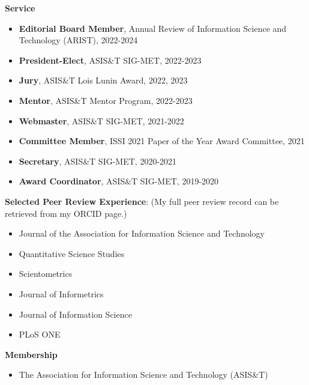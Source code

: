 \documentclass[margin, 10pt]{res} %
\begin{document}
\begin{resume}
\textbf{Service}
\begin{itemize}
\item \textbf{Editorial Board Member}, Annual Review of Information Science and Technology (ARIST), 2022-2024
\item \textbf{President-Elect}, ASIS\&T SIG-MET, 2022-2023
\item \textbf{Jury}, ASIS\&T Lois Lunin Award, 2022, 2023
\item \textbf{Mentor}, ASIS\&T Mentor Program, 2022-2023
\item \textbf{Webmaster}, ASIS\&T SIG-MET, 2021-2022
\item \textbf{Committee Member}, ISSI 2021 Paper of the Year Award Committee, 2021
\item \textbf{Secretary}, ASIS\&T SIG-MET, 2020-2021
\item \textbf{Award Coordinator}, ASIS\&T SIG-MET, 2019-2020
\end{itemize}

\textbf{Selected Peer Review Experience}:  
(My full peer review record can be retrieved from my ORCID page.)

\begin{itemize}
\item Journal of the Association for Information Science and Technology
\item Quantitative Science Studies
\item Scientometrics
\item Journal of Informetrics
\item Journal of Information Science
\item PLoS ONE
\end{itemize}

\textbf{Membership}
\begin{itemize}
\item The Association for Information Science and Technology (ASIS\&T)
\end{itemize}



\end{resume}
\end{document}
